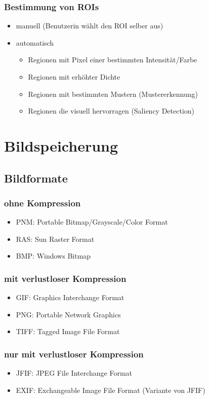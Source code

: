 \documentclass[10pt]{article}
\begin{document}
\subsubsection*{Bestimmung von ROIs}
\begin{itemize}
	\item manuell (Benutzerin wählt den ROI selber aus)
	\item automatisch
		\begin{itemize}
			\item Regionen mit Pixel einer bestimmten Intensität/Farbe
			\item Regionen mit erhöhter Dichte
			\item Regionen mit bestimmten Mustern (Mustererkennung)
			\item Regionen die visuell hervorragen (Saliency Detection)
		\end{itemize}
\end{itemize}

\pagebreak
\section{Bildspeicherung}

\subsection{Bildformate}
\subsubsection*{ohne Kompression}
\begin{itemize}
	\item PNM: Portable Bitmap/Grayscale/Color Format
	\item RAS: Sun Raster Format
	\item BMP: Windows Bitmap
\end{itemize}
\subsubsection*{mit verlustloser Kompression}
\begin{itemize}
	\item GIF: Graphics Interchange Format
	\item PNG: Portable Network Graphics
	\item TIFF: Tagged Image File Format
\end{itemize}
\subsubsection*{nur mit verlustloser Kompression}
\begin{itemize}
	\item JFIF: JPEG File Interchange Format
	\item EXIF: Exchangeable Image File Format (Variante von JFIF)
\end{itemize}
\end{document}
